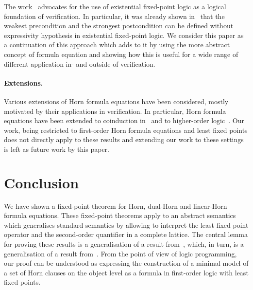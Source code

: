 \documentclass[acmsmall]{acmart}
\theoremstyle{plain}
\theoremstyle{definition}
\begin{document}
The work~\cite{Blass87Existential} advocates for the use of existential fixed-point logic
 as a logical foundation of verification.
In particular, it was already shown in~\cite{Blass87Existential} that the weakest precondition and
 the strongest postcondition can be defined without expressivity hypothesis in
 existential fixed-point logic.
We consider this paper as a continuation of this approach which adds to it by
 using the more abstract concept of formula equation and showing how this is useful for a wide
 range of different application in- and outside of verification.



\paragraph{Extensions.}

Various extensions of Horn formula equations have been considered, mostly motivated
 by their applications in verification.
In particular, Horn formula equations have been extended to coinduction
 in~\cite{Basold19Coinduction} and to higher-order logic~\cite{Jochems23Higher,Kobayashi19Temporal,Tsukada20Computability,Unno23Modular,Burn18Higher, Kobayashi18Higher,Kobayashi23Validity}.
Our work, being restricted to first-order Horn formula equations and least fixed points
 does not directly apply to these results and extending our work to these settings
 is left as future work by this paper.





%


\section{Conclusion}

We have shown a fixed-point theorem for Horn, dual-Horn and linear-Horn formula equations.
These fixed-point theorems apply to an abstract semantics which generalises standard
 semantics by allowing to interpret the least fixed-point operator and the second-order quantifier in a complete lattice.
The central lemma for proving these results is a generalisation of a result from~\cite{Nonnengart98Fixpoint},
 which, in turn, is a generalisation of a result from~\cite{Ackermann35Untersuchungen}.
From the point of view of logic programming, our proof can be understood as  
 expressing the construction of a minimal model of a set of Horn clauses on the object level as a formula
 in first-order logic with least fixed points.
\end{document}
